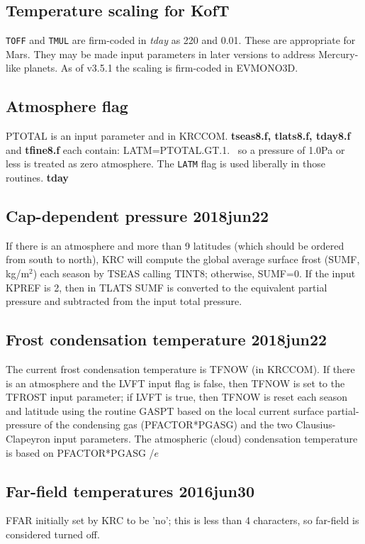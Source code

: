 \documentclass{article}
\newcommand{\np}{\textbf}  %
\newcommand{\nf}{\textit}  %
\newcommand{\nv}{\texttt}  %
\begin{document}
\subsection{Temperature scaling for KofT} 
\nv{TOFF} and \nv{TMUL} are firm-coded in \nf{tday} as 220 and 0.01. These are
appropriate for Mars.  They may be made input parameters in later versions to
address Mercury-like planets. As of v3.5.1 the scaling is firm-coded in
EVMONO3D.

\subsection{Atmosphere flag} PTOTAL is an input parameter and in KRCCOM. 
\np{tseas8.f, tlats8.f, tday8.f} and \np{tfine8.f} each contain:
LATM=PTOTAL.GT.1. \ so a pressure of 1.0Pa or less is treated as zero
atmosphere. The \nv{LATM} flag is used liberally in those routines.  \np{tday}

\subsection{ Cap-dependent pressure 2018jun22} %
If there is an atmosphere and more than 9 latitudes (which should be ordered
from south to north), KRC will compute the global average surface frost (SUMF,
kg/m$^2$) each season by TSEAS calling TINT8; otherwise, SUMF=0. If the input
KPREF is 2, then in TLATS SUMF is converted to the equivalent partial pressure
and subtracted from the input total pressure.

\subsection{Frost condensation temperature 2018jun22 } 
The current frost condensation temperature is TFNOW (in KRCCOM). If there is an
atmosphere and the LVFT input flag is false, then TFNOW is set to the TFROST
input parameter; if LVFT is true, then TFNOW is reset each season and latitude
using the routine GASPT based on the local current surface partial-pressure of
the condensing gas (PFACTOR*PGASG) and the two Clausius-Clapeyron input
parameters. The atmospheric (cloud) condensation temperature is based on
PFACTOR*PGASG /$e$

\subsection{Far-field temperatures 2016jun30}
FFAR initially set by KRC to be 'no'; this is less than 4 characters, so
far-field is considered turned off.
\end{document}
